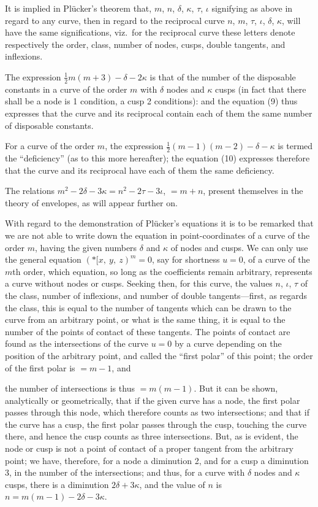 \documentclass[12pt,a4paper,oneside]{book}
\begin{document}
It is implied in Pl\"ucker's theorem that, $m$, $n$, $\delta$, $\kappa$, $\tau$, $\iota$ signifying as above in regard to any curve, then in regard to the reciprocal curve $n$, $m$, $\tau$, $\iota$, $\delta$, $\kappa$, will have the same significations, viz.\ for the reciprocal curve these letters denote respectively the order, class, number of nodes, cusps, double tangents, and inflexions.

The expression $\tfrac{1}{2}m(m+3)-\delta-2\kappa$ is that of the number of the disposable constants in a curve of the order $m$ with $\delta$ nodes and $\kappa$ cusps (in fact that there shall be a node is 1 condition, a cusp 2 conditions): and the equation (9) thus expresses that the curve and its reciprocal contain each of them the same number of disposable constants.

For a curve of the order $m$, the expression $\tfrac{1}{2}(m-1)(m-2)-\delta-\kappa$ is termed the ``deficiency'' (as to this more hereafter); the equation (10) expresses therefore that the curve and its reciprocal have each of them the same deficiency.

The relations $m^{2}-2\delta-3\kappa=n^{2}-2\tau-3\iota$, $=m+n$, present themselves in the theory of envelopes, as will appear further on.

With regard to the demonstration of Pl\"ucker's equations it is to be remarked that we are not able to write down the equation in point-coordinates of a curve of the order $m$, having the given numbers $\delta$ and $\kappa$ of nodes and cusps. We can only use the general equation $(*\!\![ x,\ y,\ z)^{m}=0$, say for shortness $u=0$, of a curve of the $m$th order, which equation, so long as the coefficients remain arbitrary, represents a curve without nodes or cusps. Seeking then, for this curve, the values $n$, $\iota$, $\tau$ of the class, number of inflexions, and number of double tangents---first, as regards the class, this is equal to the number of tangents which can be drawn to the curve from an arbitrary point, or what is the same thing, it is equal to the number of the points of contact of these tangents. The points of contact are found as the intersections of the curve $u=0$ by a curve depending on the position of the arbitrary point, and called the ``first polar'' of this point; the order of the first polar is $=m-1$, and

\newpage
the number of intersections is thus $=m(m-1)$. But it can be shown, analytically or geometrically, that if the given curve has a node, the first polar passes through this node, which therefore counts as two intersections; and that if the curve has a cusp, the first polar passes through the cusp, touching the curve there, and hence the cusp counts as three intersections. But, as is evident, the node or cusp is not a point of contact of a proper tangent from the arbitrary point; we have, therefore, for a node a diminution 2, and for a cusp a diminution 3, in the number of the intersections; and thus, for a curve with $\delta$ nodes and $\kappa$ cusps, there is a diminution $2\delta+3\kappa$, and the value of $n$ is $n=m(m-1)-2\delta-3\kappa$.
\end{document}
